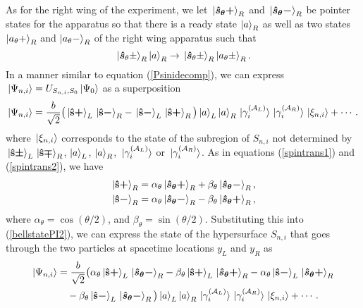 As for the right wing of the experiment, we let  $\ket*{\bm{\hat{s}_\theta+}}_R$ and $\ket*{\bm{\hat{s}_\theta-}}_R$ %
%
 be pointer states for the apparatus so that there is a ready state $\ket{a}_R$  %
   as well as two states $\ket{a_\theta+}_R$ and $\ket{a_\theta-}_R$ %
   of the right wing apparatus such that 
$$\ket*{\bm{\hat{s}}_\theta\pm}_R\ket{a}_R\rightarrow\ket*{\bm{\hat{s}}_\theta\pm}_R\ket{a_\theta\pm}_R.$$
In a manner similar to equation (\ref{Psinidecomp}), we can express $\ket*{\Psi_{n,i}}=U_{S_{n,i},S_0}\ket*{\Psi_0}$ as a superposition
\begin{equation}\label{bellstatePI2}
	\ket{\Psi_{n,i}}= \frac{b}{\sqrt{2}}\big(\ket*{{\vb{\hat{{s}}}\bm{+}}}_L\ket*{{\vb{\hat{{s}}}\bm{-}}}_R-\ket*{{\vb{\hat{{s}}}\bm{-}}}_L\ket*{{\vb{\hat{{s}}}\bm{+}}}_R\big)\ket{a}_L\ket{a}_R\ket*{\gamma_i^{(\mathcal{A}_L)}}\ket*{\gamma_i^{(\mathcal{A}_R)}}\ket*{\xi_{n,i}}+\cdots.
\end{equation}
where $\ket*{\xi_{n,i}}$ corresponds to the state of the subregion of $S_{n,i}$ not determined by $\ket*{{\vb{\hat{{s}}}\bm{\pm}}}_L\ket*{{\vb{\hat{{s}}}\bm{\mp}}}_R$, $\ket{a}_L$, $\ket{a}_R$, $\ket*{\gamma_i^{(\mathcal{A}_L)}}$ or $\ket*{\gamma_i^{(\mathcal{A}_R)}}$.
As in equations (\ref{spintrans1}) and (\ref{spintrans2}), we have
\begin{align*}
\ket*{{\vb{\hat{{s}}}\bm{+}}}_R&= \alpha_\theta\ket*{\bm{\hat{s}_\theta+}}_R+\beta_\theta \ket*{\bm{\hat{s}_\theta-}}_R,\\
\ket*{{\vb{\hat{{s}}}\bm{-}}}_R&= \alpha_\theta\ket*{\bm{\hat{s}_\theta-}}_R-\beta_\theta \ket*{\bm{\hat{s}_\theta+}}_R,
\end{align*}
where $\alpha_\theta=\cos(\theta/2)$, and $\beta_\theta=\sin(\theta/2).$
Substituting this into (\ref{bellstatePI2}), we can express the state of the hypersurface $S_{n,i}$ that goes through the two particles at spacetime locations $y_L$ and $y_R$ as
\begin{equation}\label{bellstatePI3}
	\begin{split}
	\ket{\Psi_{n,i}}&=\frac{b}{\sqrt{2}}\big(\alpha_\theta\ket*{{\vb{\hat{{s}}}\bm{+}}}_L\ket*{\bm{\hat{s}_\theta-}}_R
	-\beta_\theta\ket*{{\vb{\hat{{s}}}\bm{+}}}_L\ket*{\bm{\hat{s}_\theta+}}_R-\alpha_\theta\ket*{{\vb{\hat{{s}}}\bm{-}}}_L\ket*{\bm{\hat{s}_\theta+}}_R\\
	&\quad
	-\beta_\theta\ket*{{\vb{\hat{{s}}}\bm{-}}}_L\ket*{\bm{\hat{s}_\theta-}}_R\big)\ket{a}_L\ket{a}_R\ket*{\gamma_i^{(\mathcal{A}_L)}}\ket*{\gamma_i^{(\mathcal{A}_R)}}\ket*{\xi_{n,i}}+\cdots.
	\end{split}
\end{equation}
